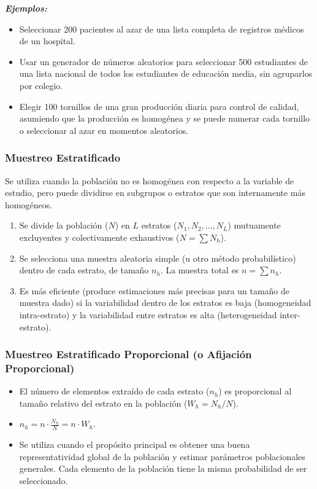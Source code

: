 \documentclass[12pt, letterpaper]{article}
\begin{document}
\textbf{\textit{Ejemplos:}}
\begin{itemize}
    \item Seleccionar 200 pacientes al azar de una lista completa de registros médicos de un hospital.
    \item Usar un generador de números aleatorios para seleccionar 500 estudiantes de una lista nacional de todos los estudiantes de educación media, sin agruparlos por colegio.
    \item Elegir 100 tornillos de una gran producción diaria para control de calidad, asumiendo que la producción es homogénea y se puede numerar cada tornillo o seleccionar al azar en momentos aleatorios.
\end{itemize}

\subsubsection{Muestreo Estratificado}
Se utiliza cuando la población no es homogénea con respecto a la variable de estudio, pero puede dividirse en subgrupos o estratos que son internamente más homogéneos.
\begin{enumerate}
    \item Se divide la población ($N$) en $L$ estratos ($N_1, N_2, \dots, N_L$) mutuamente excluyentes y colectivamente exhaustivos ($N = \sum N_h$).
    \item Se selecciona una muestra aleatoria simple (u otro método probabilístico) dentro de cada estrato, de tamaño $n_h$. La muestra total es $n = \sum n_h$.
    \item Es más eficiente (produce estimaciones más precisas para un tamaño de muestra dado) si la variabilidad dentro de los estratos es baja (homogeneidad intra-estrato) y la variabilidad entre estratos es alta (heterogeneidad inter-estrato).
\end{enumerate}

\subsubsection*{Muestreo Estratificado Proporcional (o Afijación Proporcional)}
\begin{itemize}
    \item El número de elementos extraído de cada estrato ($n_h$) es proporcional al tamaño relativo del estrato en la población ($W_h = N_h/N$).
    \item $n_h = n \cdot \frac{N_h}{N} = n \cdot W_h$.
    \item Se utiliza cuando el propósito principal es obtener una buena representatividad global de la población y estimar parámetros poblacionales generales. Cada elemento de la población tiene la misma probabilidad de ser seleccionado.
\end{itemize}
\end{document}
